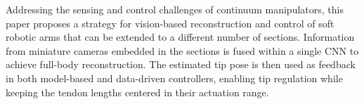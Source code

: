 Addressing the sensing and control challenges of continuum manipulators, this paper proposes a strategy for vision-based reconstruction and control of soft robotic arms that can be extended to a different number of sections. Information from miniature cameras embedded in the sections is fused within a single CNN to achieve full-body reconstruction. The estimated tip pose is then used as feedback in both model-based and data-driven controllers, enabling tip regulation while keeping the tendon lengths centered in their actuation range.
